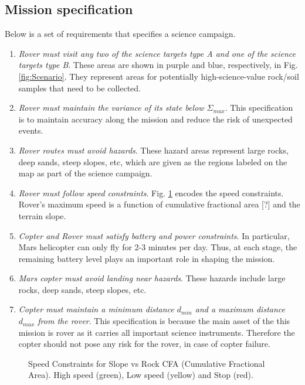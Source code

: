\documentclass[conference]{IEEEtran}
\begin{document}
	\subsection{Mission specification}
	\label{sec:misspec}
	Below is a set of requirements that specifies a science campaign.
	\begin{enumerate}
      \item \textit{Rover must visit any two of the science targets type A and one of the science targets type B}. These areas are shown in purple and blue, respectively, in Fig. \ref{fig:Scenario}. They represent areas for potentially high-science-value rock/soil samples that need to be collected.
      \item \textit{Rover must maintain the variance of its state below $\Sigma_{max}$}. This specification is to maintain accuracy along the mission and reduce the risk of unexpected events.
      \item \textit{Rover routes must avoid hazards}. These hazard areas represent large rocks, deep sands, steep slopes, etc, which are given as the regions labeled on the map as part of the science campaign.
      \item \textit{Rover must follow speed constraints}. Fig. \ref{fig:SpeedConstriants} encodes the speed constraints. Rover's maximum speed is a function of cumulative fractional area [?] and the terrain slope.
      \item \textit{Copter and Rover must satisfy battery and power constraints}. In particular, Mars helicopter can only fly for 2-3 minutes per day. Thus, at each stage, the remaining battery level plays an important role in shaping the mission.
      \item \textit{Mars copter must avoid landing near hazards}. These hazards include large rocks, deep sands, steep slopes, etc.
      \item \textit{Copter must maintain a minimum distance $d_{min}$ and a maximum distance $d_{max}$ from the rover}. This specification is because the main asset of the this mission is rover as it carries all important science instruments. Therefore the copter should not pose any risk for the rover, in case of copter failure.
    \end{enumerate}

    \begin{figure}[h]
	\centering
	\scalebox{.5}{}
	\caption{Speed Constraints for Slope vs Rock CFA (Cumulative Fractional Area). High speed (green), Low speed (yellow) and Stop (red).}
	\label{fig:SpeedConstriants}
    \end{figure}
\end{document}
